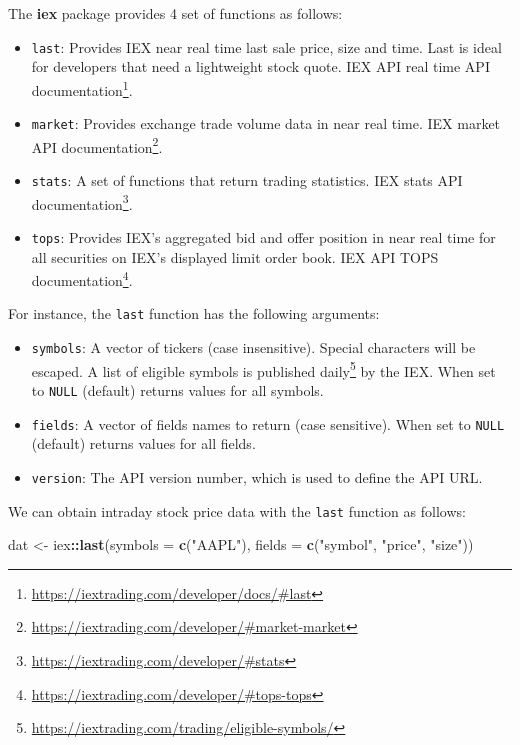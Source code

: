 \documentclass[]{book}
\newenvironment{Shaded}{\begin{snugshade}}{\end{snugshade}}
\newcommand{\KeywordTok}[1]{\textcolor[rgb]{0.13,0.29,0.53}{\textbf{#1}}}
\newcommand{\DataTypeTok}[1]{\textcolor[rgb]{0.13,0.29,0.53}{#1}}
\newcommand{\StringTok}[1]{\textcolor[rgb]{0.31,0.60,0.02}{#1}}
\newcommand{\OperatorTok}[1]{\textcolor[rgb]{0.81,0.36,0.00}{\textbf{#1}}}
\newcommand{\NormalTok}[1]{#1}
\DeclareRobustCommand{\href}[2]{#2\footnote{\url{#1}}}
\providecommand{\tightlist}{%
  \setlength{\itemsep}{0pt}\setlength{\parskip}{0pt}}
\theoremstyle{definition}
\theoremstyle{definition}
\theoremstyle{definition}
\theoremstyle{remark}
\begin{document}
The \textbf{iex} package provides 4 set of functions as follows:

\begin{itemize}
\tightlist
\item
  \texttt{last}: Provides IEX near real time last sale price, size and
  time. Last is ideal for developers that need a lightweight stock
  quote. \href{https://iextrading.com/developer/docs/\#last}{IEX API
  real time API documentation}.
\item
  \texttt{market}: Provides exchange trade volume data in near real
  time. \href{https://iextrading.com/developer/\#market-market}{IEX
  market API documentation}.
\item
  \texttt{stats}: A set of functions that return trading statistics.
  \href{https://iextrading.com/developer/\#stats}{IEX stats API
  documentation}.
\item
  \texttt{tops}: Provides IEX's aggregated bid and offer position in
  near real time for all securities on IEX's displayed limit order book.
  \href{https://iextrading.com/developer/\#tops-tops}{IEX API TOPS
  documentation}.
\end{itemize}

For instance, the \texttt{last} function has the following arguments:

\begin{itemize}
\tightlist
\item
  \texttt{symbols}: A vector of tickers (case insensitive). Special
  characters will be escaped. A list of eligible symbols is
  \href{https://iextrading.com/trading/eligible-symbols/}{published
  daily} by the IEX. When set to \texttt{NULL} (default) returns values
  for all symbols.
\item
  \texttt{fields}: A vector of fields names to return (case sensitive).
  When set to \texttt{NULL} (default) returns values for all fields.
\item
  \texttt{version}: The API version number, which is used to define the
  API URL.
\end{itemize}

We can obtain intraday stock price data with the \texttt{last} function
as follows:

\begin{Shaded}
\begin{Highlighting}[]
\NormalTok{dat <-}\StringTok{ }\NormalTok{iex}\OperatorTok{::}\KeywordTok{last}\NormalTok{(}\DataTypeTok{symbols =} \KeywordTok{c}\NormalTok{(}\StringTok{"AAPL"}\NormalTok{), }\DataTypeTok{fields =} \KeywordTok{c}\NormalTok{(}\StringTok{"symbol"}\NormalTok{, }
  \StringTok{"price"}\NormalTok{, }\StringTok{"size"}\NormalTok{))}
\end{Highlighting}
\end{Shaded}
\end{document}
